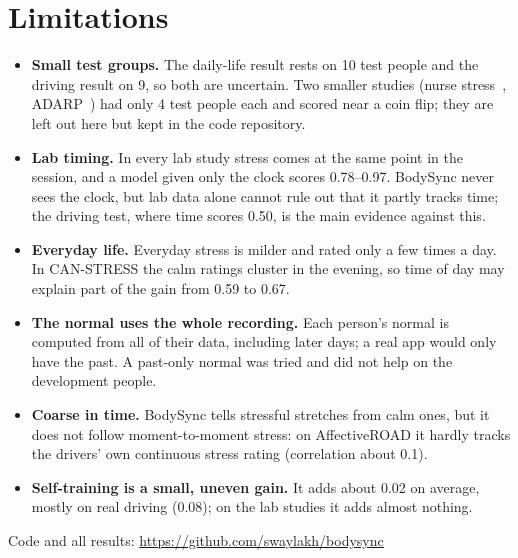\documentclass{article}
\begin{document}
\section{Limitations}

\begin{itemize}
\item \textbf{Small test groups.} The daily-life result rests on 10 test people and the driving result on 9, so both are uncertain. Two smaller studies (nurse stress~\cite{nurse}, ADARP~\cite{adarp}) had only 4 test people each and scored near a coin flip; they are left out here but kept in the code repository.
\item \textbf{Lab timing.} In every lab study stress comes at the same point in the session, and a model given only the clock scores 0.78--0.97. BodySync never sees the clock, but lab data alone cannot rule out that it partly tracks time; the driving test, where time scores 0.50, is the main evidence against this.
\item \textbf{Everyday life.} Everyday stress is milder and rated only a few times a day. In CAN-STRESS the calm ratings cluster in the evening, so time of day may explain part of the gain from 0.59 to 0.67.
\item \textbf{The normal uses the whole recording.} Each person's normal is computed from all of their data, including later days; a real app would only have the past. A past-only normal was tried and did not help on the development people.
\item \textbf{Coarse in time.} BodySync tells stressful stretches from calm ones, but it does not follow moment-to-moment stress: on AffectiveROAD it hardly tracks the drivers' own continuous stress rating (correlation about 0.1).
\item \textbf{Self-training is a small, uneven gain.} It adds about 0.02 on average, mostly on real driving (0.08); on the lab studies it adds almost nothing.
\end{itemize}

Code and all results: \url{https://github.com/swaylakh/bodysync}
\end{document}
